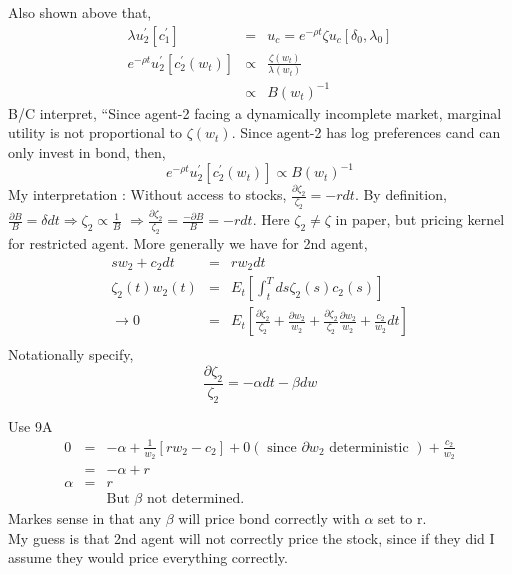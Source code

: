 \documentclass[]{article}
\begin{document}
Also shown above that,
\begin{eqnarray*}
\lambda u_2^\prime[c_1^\prime]&=& u_c = e^{-\rho t} \zeta u_c[\delta_0, \lambda_0]\\
e^{-\rho t} u_2^\prime[c_2^\prime(w_t)] &\propto & \frac{\zeta (w_t)}{\lambda (w_t)}\\
&\propto & B(w_t)^{-1}
\end{eqnarray*}
B/C interpret, ``Since agent-2 facing a dynamically incomplete market, marginal utility is not proportional to $\zeta(w_t) $. Since agent-2 has log preferences cand can only invest in bond, then,
\begin{equation*}
e^{-\rho t} u_2^\prime[c_2^\prime(w_t)] \propto B(w_t)^{-1}
\end{equation*}
My interpretation : Without access to stocks, $\frac{\partial \zeta_2}{\zeta_2} = -rdt$. By definition, $\frac{\partial B}{B} = \delta dt \Rightarrow \zeta_2 \propto \frac{1}{B}$ $\Rightarrow \frac{\partial \zeta_2}{\zeta_2} = \frac{-\partial B}{B} = -rdt$. Here $\zeta_2 \neq \zeta$ in paper, but pricing kernel for restricted agent. More generally we have for 2nd agent,
\begin{eqnarray*}
sw_2 + c_2dt &=& rw_2dt\\
\zeta_2(t) w_2(t) &=& E_t[\int_t^T ds \zeta_2(s) c_2(s)]\\
\rightarrow	0 &=& E_t\left[\frac{\partial \zeta_2}{\zeta_2}+\frac{\partial w_2}{w_2} + \frac{\partial \zeta_2}{\zeta_2} \frac{\partial w_2}{w_2} + \frac{c_2}{w_2} dt\right]\\
\end{eqnarray*}
Notationally specify,
\begin{equation}
\frac{\partial \zeta_2}{\zeta_2} = -\alpha dt - \beta dw \tag{9A}
\end{equation}

Use 9A
\begin{eqnarray*}
0&=& -\alpha + \frac{1}{w_2} [rw_2-c_2] + 0(\mbox{ since $\partial w_2$ deterministic }) + \frac{c_2}{w_2}\\
&=& -\alpha + r \\
\alpha &=& r\\
&& \mbox{But $\beta$ not determined.}
\end{eqnarray*}
Markes sense in that any $\beta $ will price bond correctly with $\alpha $ set to r.\\

My guess is that 2nd agent will not correctly price the stock, since if they did I assume they would price everything correctly.\\
\end{document}
